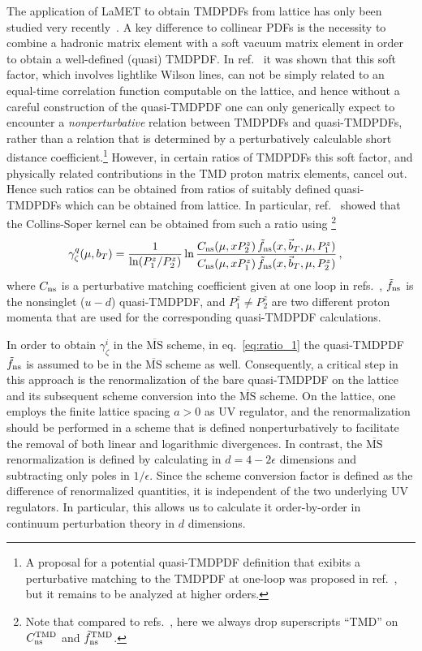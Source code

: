\documentclass[11pt,a4paper]{article}
\DeclareRobustCommand{\eq}[1]{eq.~\eqref{eq:#1}}
\DeclareRobustCommand{\mycite}[1]{ref.~\cite{#1}}
\DeclareRobustCommand{\mycites}[1]{refs.~\cite{#1}}
\newcommand{\MS}{{\overline{\mathrm{MS}}}}
\newcommand{\eps}{\epsilon}
\newcommand{\bt}{\vec b_T}
\newcommand{\ns}{{\rm ns}}
\begin{document}
The application of LaMET to obtain TMDPDFs from lattice has only been studied very recently~\cite{Ji:2014hxa,Ji:2018hvs,Ebert:2018gzl,Ebert:2019okf}.
A key difference to collinear PDFs is the necessity to combine a hadronic matrix element with a soft vacuum matrix element in order to obtain a well-defined (quasi) TMDPDF.
In \mycite{Ebert:2019okf} it was shown that this soft factor, which involves lightlike Wilson lines, can not be simply related to an equal-time correlation function computable on the lattice, and hence without a careful construction of the quasi-TMDPDF one can only generically expect to encounter a \emph{nonperturbative} relation between TMDPDFs and quasi-TMDPDFs, rather than a relation that is determined by a perturbatively calculable short distance coefficient.\footnote{A proposal for a potential quasi-TMDPDF definition that exibits a perturbative matching to the TMDPDF at one-loop was proposed in \mycite{Ebert:2019okf}, but it remains to be analyzed at higher orders.}
However, in certain ratios of TMDPDFs this soft factor, and physically related contributions in the TMD proton matrix elements, cancel out. Hence such ratios can be obtained from ratios of suitably defined quasi-TMDPDFs which can be obtained from lattice.
In particular, \mycite{Ebert:2018gzl} showed that the Collins-Soper kernel can be obtained from such a ratio using%
\footnote{Note that compared to \mycites{Ebert:2018gzl,Ebert:2019okf}, here we always drop superscripts ``TMD'' on $C_\ns^\mathrm{TMD}$ and $\tilde f_\ns^\mathrm{TMD}$.}
\begin{align} \label{eq:ratio_1}
 \gamma^q_\zeta(\mu, b_T) & = \frac{1}{\ln(P^z_1/P^z_2)}
  \ln \frac{C_\ns(\mu,x P_2^z)\, \tilde f_\ns(x, \bt, \mu, P^z_1)}
           {C_\ns(\mu,x P_1^z)\, \tilde f_\ns(x, \bt, \mu, P^z_2)}
\,,\end{align}
where $C_\ns$ is a perturbative matching coefficient given at one loop in \mycites{Ebert:2018gzl,Ebert:2019okf}, $\tilde f_\ns$ is the nonsinglet ($u{-}d$) quasi-TMDPDF, and $P^z_1 \ne P^z_2$ are two different proton momenta that are used for the corresponding quasi-TMDPDF calculations.


In order to obtain $\gamma_\zeta^i$ in the $\MS$ scheme, in \eq{ratio_1} the quasi-TMDPDF $\tilde f_\ns$ is assumed to be in the $\MS$ scheme as well.
Consequently, a critical step in this approach is the renormalization of the bare quasi-TMDPDF on the lattice and its subsequent scheme conversion into the $\MS$ scheme.
On the lattice, one employs the finite lattice spacing $a>0$ as UV regulator, and the renormalization should be performed in a scheme that is defined nonperturbatively to facilitate the removal of both linear and logarithmic divergences.
In contrast, the $\MS$ renormalization is defined by calculating in $d=4-2\eps$ dimensions and subtracting only poles in $1/\eps$.
Since the scheme conversion factor is defined as the difference of renormalized quantities, it is independent of the two underlying UV regulators.
In particular, this allows us to calculate it order-by-order in continuum perturbation theory in $d$ dimensions.
\end{document}
